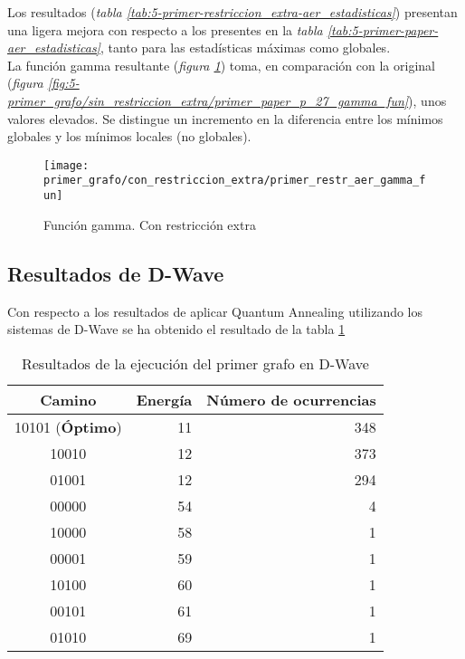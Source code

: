 \documentclass{article}
\begin{document}
Los resultados (\textit{tabla \ref{tab:5-primer-restriccion_extra-aer_estadisticas}}) presentan una ligera mejora con respecto a los presentes en la \textit{tabla \ref{tab:5-primer-paper-aer_estadisticas}}, tanto para las estadísticas máximas como globales. \\

La función gamma resultante (\textit{figura \ref{fig:5-primer_grafo/con_restriccion_extra/primer_restr_aer_gamma_fun}}) toma, en comparación con la original (\textit{figura \ref{fig:5-primer_grafo/sin_restriccion_extra/primer_paper_p_27_gamma_fun}}), unos valores elevados. Se distingue un incremento en la diferencia entre los mínimos globales y los mínimos locales (no globales).
\begin{figure}[htbp]
  \centering
  \texttt{[image: primer\_grafo/con\_restriccion\_extra/primer\_restr\_aer\_gamma\_fun]}
  \caption{Función gamma. Con restricción extra} \label{fig:5-primer_grafo/con_restriccion_extra/primer_restr_aer_gamma_fun}
\end{figure}
  
\subsection{Resultados de D-Wave}
Con respecto a los resultados de aplicar Quantum Annealing utilizando los sistemas de D-Wave se ha obtenido el resultado de la tabla \ref{tab:5-primer-dwave_estadisticas}

\begin{table}[htbp]
  \centering
  \begin{tabular}{|c|r|r|}
    \hline
    \textbf{Camino} & \textbf{Energía} & \textbf{Número de ocurrencias} \\ \hline
    10101 (\textbf{Óptimo}) & 11 & 348 \\ \hline
    10010                   & 12 & 373 \\ \hline
    01001                   & 12 & 294 \\ \hline
    00000                   & 54 &   4 \\ \hline
    10000                   & 58 &   1 \\ \hline
    00001                   & 59 &   1 \\ \hline
    10100                   & 60 &   1 \\ \hline
    00101                   & 61 &   1 \\ \hline
    01010                   & 69 &   1 \\ \hline
  \end{tabular}
  \caption{Resultados de la ejecución del primer grafo en D-Wave}
  \label{tab:5-primer-dwave_estadisticas}
\end{table}
\end{document}
